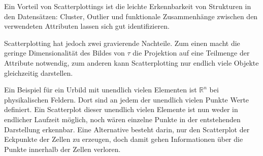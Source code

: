 \documentclass[a4paper,fontsize=12pt,toc=bib,halfparskip,ngerman]{scrartcl}
\begin{document}
Ein Vorteil von Scatterplottings ist die leichte Erkennbarkeit von Strukturen in den Datens\"atzen: Cluster, Outlier und funktionale Zusammenh\"ange zwischen den verwendeten Attributen lassen sich gut identifizieren. 

Scatterplotting hat jedoch zwei gravierende Nachteile. Zum einen macht die geringe Dimensionalit\"at des Bildes von $\tau$ die Projektion auf eine Teilmenge der Attribute notwendig, zum anderen kann Scatterplotting nur endlich viele Objekte gleichzeitig darstellen. 

Ein Beispiel f\"ur ein Urbild mit unendlich vielen Elementen ist $\mathbb{R}^n$ bei physikalischen Feldern. Dort sind an jedem der unendlich vielen Punkte Werte definiert. Ein Scatterplot dieser unendlich vielen Elemente ist nun weder in endlicher Laufzeit m\"oglich, noch w\"aren einzelne Punkte in der entstehenden Darstellung erkennbar. Eine Alternative besteht darin, nur den Scatterplot der Eckpunkte der Zellen zu erzeugen, doch damit gehen Informationen \"uber die Punkte innerhalb der Zellen verloren.
\end{document}
